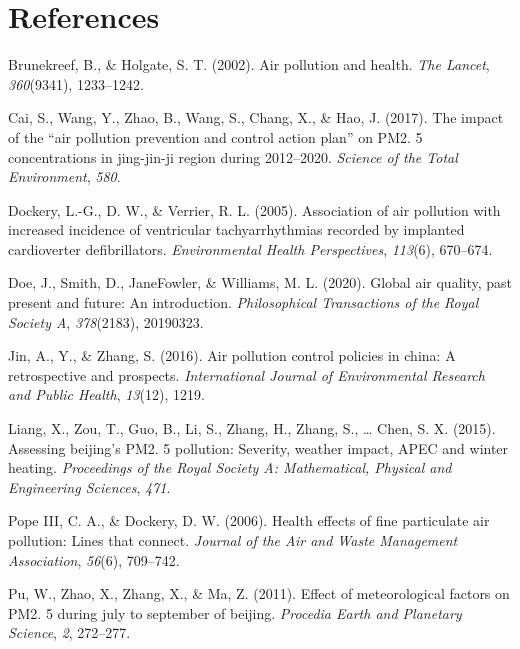 \documentclass[
  12pt,
]{article}
\newlength{\cslhangindent}
\newlength{\cslentryspacingunit} %
\newenvironment{CSLReferences}[2] %
 {%
  \setlength{\parindent}{0pt}
  \ifodd #1
  \let\oldpar\par
  \def\par{\hangindent=\cslhangindent\oldpar}
  \fi
  \setlength{\parskip}{#2\cslentryspacingunit}
 }%
 {}
\begin{document}
\newpage

\hypertarget{references}{%
\section*{References}\label{references}}

\hypertarget{refs}{}
\begin{CSLReferences}{1}{0}
\leavevmode{}%
Brunekreef, B., \& Holgate, S. T. (2002). Air pollution and health.
\emph{The Lancet}, \emph{360}(9341), 1233--1242.

\leavevmode{}%
Cai, S., Wang, Y., Zhao, B., Wang, S., Chang, X., \& Hao, J. (2017). The
impact of the {``air pollution prevention and control action plan''} on
PM2. 5 concentrations in jing-jin-ji region during 2012--2020.
\emph{Science of the Total Environment}, \emph{580}.

\leavevmode{}%
Dockery, L.-G., D. W., \& Verrier, R. L. (2005). Association of air
pollution with increased incidence of ventricular tachyarrhythmias
recorded by implanted cardioverter defibrillators. \emph{Environmental
Health Perspectives}, \emph{113}(6), 670--674.

\leavevmode{}%
Doe, J., Smith, D., JaneFowler, \& Williams, M. L. (2020). Global air
quality, past present and future: An introduction. \emph{Philosophical
Transactions of the Royal Society A}, \emph{378}(2183), 20190323.

\leavevmode{}%
Jin, A., Y., \& Zhang, S. (2016). Air pollution control policies in
china: A retrospective and prospects. \emph{International Journal of
Environmental Research and Public Health}, \emph{13}(12), 1219.

\leavevmode{}%
Liang, X., Zou, T., Guo, B., Li, S., Zhang, H., Zhang, S., \ldots{}
Chen, S. X. (2015). Assessing beijing's PM2. 5 pollution: Severity,
weather impact, APEC and winter heating. \emph{Proceedings of the Royal
Society A: Mathematical, Physical and Engineering Sciences}, \emph{471}.

\leavevmode{}%
Pope III, C. A., \& Dockery, D. W. (2006). Health effects of fine
particulate air pollution: Lines that connect. \emph{Journal of the Air
and Waste Management Association}, \emph{56}(6), 709--742.

\leavevmode{}%
Pu, W., Zhao, X., Zhang, X., \& Ma, Z. (2011). Effect of meteorological
factors on PM2. 5 during july to september of beijing. \emph{Procedia
Earth and Planetary Science}, \emph{2}, 272--277.

\end{CSLReferences}
\end{document}
